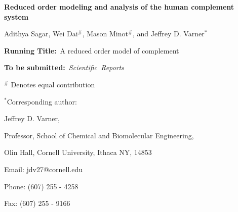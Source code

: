\documentclass[12pt]{article}
\begin{document}
\begin{titlepage}
{\par\centering\textbf{\Large {Reduced order modeling and analysis of the human complement system}}}
\vspace{0.05in}
{\par \centering \large{Adithya Sagar, Wei Dai$^{\#}$, Mason Minot$^{\#}$, and Jeffrey D. Varner$^{*}$}}
\vspace{0.10in}
{\par {}}
{\par {}}
\vspace{0.1in}
{\par \centering \textbf{Running Title:}~A reduced order model of complement}
\vspace{0.1in}
{\par \centering \textbf{To be submitted:}~\emph{Scientific~Reports}}
\vspace{0.5in}
{\par \centering $^{\#}$ Denotes equal contribution}
\vspace{0.1in}
{\par \centering $^{*}$Corresponding author:}
{\par \centering Jeffrey D. Varner,}
{\par \centering Professor, School of Chemical and Biomolecular Engineering,}
{\par {} Olin Hall, Cornell University, Ithaca NY, 14853}
{\par \centering Email: jdv27@cornell.edu}
{\par \centering Phone: (607) 255 - 4258}
{\par \centering Fax: (607) 255 - 9166}
\end{titlepage}
\date{}
\thispagestyle{empty}
\pagebreak
\end{document}
